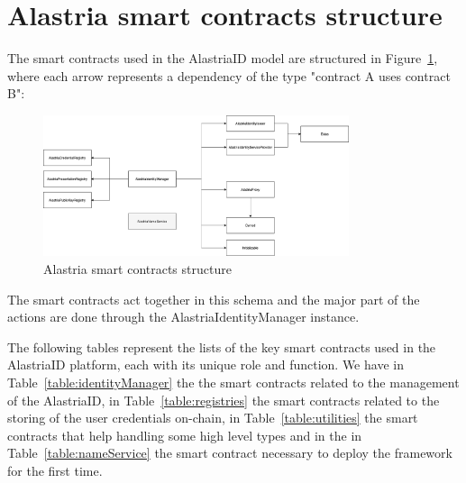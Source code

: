 \documentclass[target=mst,aauheader=]{thud}
\begin{document}
\section{Alastria smart contracts structure}

The smart contracts used in the AlastriaID model are structured in Figure~\ref{fig:alastriaSCStructure}, where each arrow represents a dependency of the type "contract A uses contract B":

\begin{figure}
    \centering
    \includegraphics[width=0.8\textwidth]{images/alastriaSmartContractsStructure.png}
    \caption{Alastria smart contracts structure}
    \label{fig:alastriaSCStructure}
\end{figure}

The smart contracts act together in this schema and the major part of the actions are done through the AlastriaIdentityManager instance.\par

The following tables represent the lists of the key smart contracts used in the AlastriaID platform, each with its unique role and function. We have in Table~\ref{table:identityManager} the the smart contracts related to the management of the AlastriaID, in Table~\ref{table:registries} the smart contracts related to the storing of the user credentials on-chain, in Table~\ref{table:utilities} the smart contracts that help handling some high level types and in the in Table~\ref{table:nameService} the smart contract necessary to deploy the framework for the first time.
\end{document}
